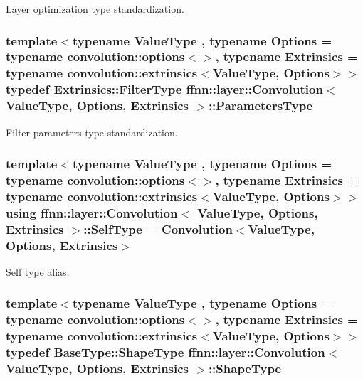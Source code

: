 \hyperlink{classffnn_1_1layer_1_1_layer}{Layer} optimization type standardization. 

\hypertarget{classffnn_1_1layer_1_1_convolution_ad66f693126a5a4b3cc7398f3be7c22a7}{
\subsubsection[{Parameters\-Type}]{\setlength{\rightskip}{0pt plus 5cm}template$<$typename Value\-Type , typename Options  = typename convolution\-::options$<$$>$, typename Extrinsics  = typename convolution\-::extrinsics$<$\-Value\-Type, Options$>$$>$ typedef Extrinsics\-::\-Filter\-Type {\bf ffnn\-::layer\-::\-Convolution}$<$ Value\-Type, Options, Extrinsics $>$\-::{\bf Parameters\-Type}}}\label{classffnn_1_1layer_1_1_convolution_ad66f693126a5a4b3cc7398f3be7c22a7}


Filter parameters type standardization. 

\hypertarget{classffnn_1_1layer_1_1_convolution_ac3985357df433360d75f39353faae600}{
\subsubsection[{Self\-Type}]{\setlength{\rightskip}{0pt plus 5cm}template$<$typename Value\-Type , typename Options  = typename convolution\-::options$<$$>$, typename Extrinsics  = typename convolution\-::extrinsics$<$\-Value\-Type, Options$>$$>$ using {\bf ffnn\-::layer\-::\-Convolution}$<$ Value\-Type, Options, Extrinsics $>$\-::{\bf Self\-Type} =  {\bf Convolution}$<$Value\-Type, Options, Extrinsics$>$}}\label{classffnn_1_1layer_1_1_convolution_ac3985357df433360d75f39353faae600}


Self type alias. 

\hypertarget{classffnn_1_1layer_1_1_convolution_ab76070ee3cc7b42325f46bc3bc86bf5f}{
\subsubsection[{Shape\-Type}]{\setlength{\rightskip}{0pt plus 5cm}template$<$typename Value\-Type , typename Options  = typename convolution\-::options$<$$>$, typename Extrinsics  = typename convolution\-::extrinsics$<$\-Value\-Type, Options$>$$>$ typedef Base\-Type\-::\-Shape\-Type {\bf ffnn\-::layer\-::\-Convolution}$<$ Value\-Type, Options, Extrinsics $>$\-::{\bf Shape\-Type}}}\label{classffnn_1_1layer_1_1_convolution_ab76070ee3cc7b42325f46bc3bc86bf5f}


